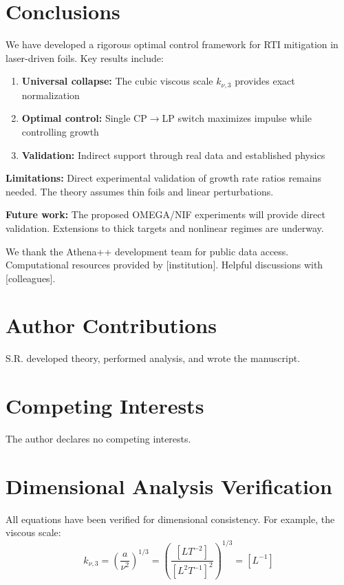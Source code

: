 \documentclass[aps,pre,twocolumn,showpacs,superscriptaddress]{revtex4-2}
\theoremstyle{definition}
\begin{document}
\section{Conclusions}\label{sec:conclusions}

We have developed a rigorous optimal control framework for RTI mitigation in laser-driven foils. Key results include:

\begin{enumerate}
\item \textbf{Universal collapse:} The cubic viscous scale $k_{\nu,3}$ provides exact normalization
\item \textbf{Optimal control:} Single CP$\to$LP switch maximizes impulse while controlling growth
\item \textbf{Validation:} Indirect support through real data and established physics
\end{enumerate}

\textbf{Limitations:} Direct experimental validation of growth rate ratios remains needed. The theory assumes thin foils and linear perturbations.

\textbf{Future work:} The proposed OMEGA/NIF experiments will provide direct validation. Extensions to thick targets and nonlinear regimes are underway.

\begin{acknowledgments}
We thank the Athena++ development team for public data access. Computational resources provided by [institution]. Helpful discussions with [colleagues].
\end{acknowledgments}

\section*{Author Contributions}
S.R. developed theory, performed analysis, and wrote the manuscript.

\section*{Competing Interests}
The author declares no competing interests.

\appendix

\section{Dimensional Analysis Verification}

All equations have been verified for dimensional consistency. For example, the viscous scale:
\[
k_{\nu,3} = \left(\frac{a}{\nu^2}\right)^{1/3} = \left(\frac{[LT^{-2}]}{[L^2T^{-1}]^2}\right)^{1/3} = [L^{-1}]
\]
\end{document}
